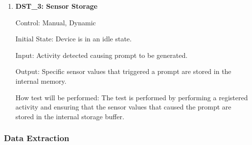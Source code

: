 \documentclass[12pt, titlepage]{article}
\begin{document}
\begin{enumerate}
	\item{\textbf{DST\_3: Sensor Storage} \\}\label{DST3}
	
		Control: Manual, Dynamic
							
		Initial State: Device is in an idle state.
							
		Input: Activity detected causing prompt to be generated.
		
		Output: Specific sensor values that triggered a prompt are stored in the internal memory.
							
		How test will be performed: The test is performed by performing a registered activity and ensuring that the sensor values that caused the prompt are stored in the internal storage buffer.
\end{enumerate}
\subsubsection{Data Extraction}
\end{document}

